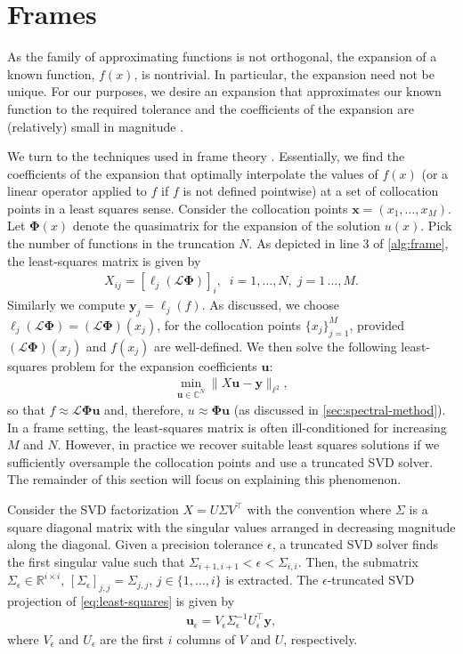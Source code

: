 \documentclass[10pt,a4paper]{article}
\newcommand{\vectt}[1]{\boldsymbol{\mathbf{#1}}}
\numberwithin{equation}{section}
\begin{document}
\section{Frames}
\label{sec:frames}
As the family of approximating functions is not orthogonal, the expansion of a known function, $f(x)$, is nontrivial. In particular, the expansion need not be unique. For our purposes, we desire an expansion that approximates our known function to the required tolerance and the coefficients of the expansion are (relatively) small in magnitude \cite{adcock2021}.

We turn to the techniques used in frame theory \cite{Adcock2019, Adcock2020}. Essentially, we find the coefficients of the expansion that optimally interpolate the values of $f(x)$ (or a linear operator applied to $f$ if $f$ is not defined pointwise) at a set of collocation points in a least squares sense. Consider the collocation points $\vectt{x} = (x_1,\dots,x_M)$. Let ${\bm \Phi}(x)$ denote the quasimatrix for the expansion of the solution $u(x)$. Pick the number of functions in the truncation $N$.  As depicted in line 3 of \cref{alg:frame},  the least-squares matrix is given by
\begin{align}
X_{ij} = [\ell_j(\mathcal{L} {\bm \Phi})]_i, \;\; i=1,\dots,N, \; j=1\,\dots,M.
\label{def:least-squares-matrix}
\end{align}
Similarly we compute $\vectt{y}_j = \ell_j(f)$. As discussed, we choose $\ell_j(\mathcal{L} {\bm \Phi}) = (\mathcal{L} {\bm \Phi})(x_j)$, for the collocation points $\{x_j\}_{j=1}^M$,  provided  $(\mathcal{L} {\bm \Phi})(x_j)$ and $f(x_j)$ are well-defined. We then solve the following least-squares problem for the expansion coefficients ${\mathbf u}$:
\begin{align}
\min_{{\mathbf u} \in \mathbb{C}^N} \|X{\mathbf u} - \vectt{y}\|_{\ell^2}, 
\label{eq:least-squares}
\end{align}
so that $f \approx \mathcal{L} {\bm \Phi} {\mathbf u}$ and, therefore, $u \approx {\bm \Phi}{\mathbf u}$ (as discussed in \cref{sec:spectral-method}). In a frame setting, the least-squares matrix is often ill-conditioned for increasing $M$ and $N$. However, in practice we recover suitable least squares solutions if we sufficiently oversample the collocation points and use a truncated SVD solver. The remainder of this section will focus on explaining this phenomenon.

Consider the SVD factorization $X = U \Sigma V^\top$ with the convention where $\Sigma$ is a square diagonal matrix with the singular values arranged in decreasing magnitude along the diagonal. Given a precision tolerance $\epsilon$, a truncated SVD solver finds the first singular value such that $\Sigma_{i+1,i+1} < \epsilon < \Sigma_{i,i}$. Then, the submatrix $\Sigma_\epsilon \in \mathbb{R}^{i \times i}$, $[\Sigma_\epsilon]_{j,j}= \Sigma_{j,j}$, $j \in \{1,\dots,i\}$ is extracted. The $\epsilon$-truncated SVD projection of \cref{eq:least-squares} is given by
\begin{align}
{\mathbf u}_\epsilon = V_\epsilon \Sigma^{-1}_\epsilon U_\epsilon^\top {\mathbf y},
\end{align}
where $V_\epsilon$ and $U_\epsilon$ are the first $i$ columns of $V$ and $U$, respectively. 
\end{document}
